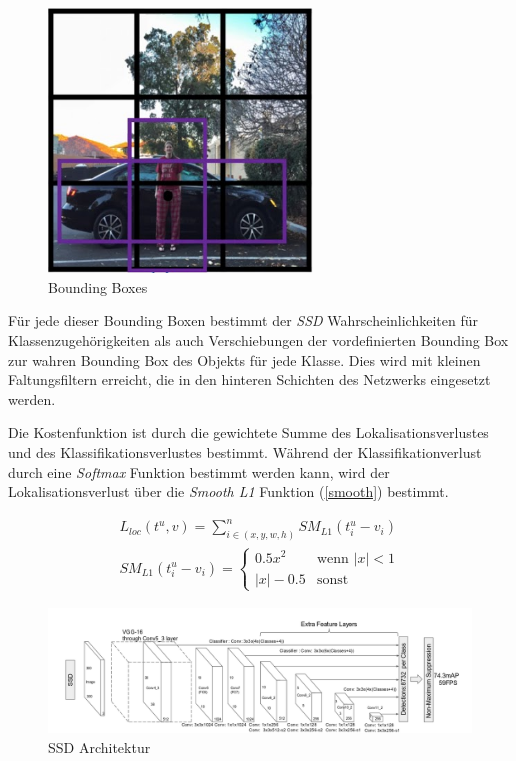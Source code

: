 \begin{figure}[ht]
	\begin{center}
		\includegraphics[width=7cm]{Bilder/bounding_boxes.png} 
		\caption[Bounding Boxes]{Bounding Boxes \cite{AndrewNg.2019}}
		\label{boundingboxes}
	\end{center}
\end{figure}

Für jede dieser Bounding Boxen bestimmt der \textit{SSD} Wahrscheinlichkeiten für Klassenzugehörigkeiten als auch Verschiebungen der vordefinierten Bounding Box zur wahren Bounding Box des Objekts für jede Klasse. Dies wird mit kleinen Faltungsfiltern erreicht, die in den hinteren Schichten des Netzwerks eingesetzt werden. \cite{ssd.20161229}

Die Kostenfunktion ist durch die gewichtete Summe des Lokalisationsverlustes und des Klassifikationsverlustes bestimmt. Während der Klassifikationverlust durch eine \textit{Softmax} Funktion bestimmt werden kann, wird der Lokalisationsverlust über die \textit{Smooth L1} Funktion (\ref{smooth}) bestimmt. \cite{ssd.20161229}

\begin{equation}\label{smooth}
\begin{split}
L_{loc}(t^u,v) = \sum\limits_{i \in (x,y,w,h)}^{n} SM_{L1}(t^u_i - v_i) \\
SM_{L1}(t^u_i - v_i) = \begin{cases}
							0.5x^2      & \text{wenn } |x| < 1\\
							|x| - 0.5   & \text{sonst}
						   \end{cases}
\end{split}
\end{equation}

\begin{figure}[ht]
	\begin{center}
		\includegraphics[width=15cm]{Bilder/ssd_architecture.png} 
		\caption[SSD Architektur]{SSD Architektur \cite{ssd.20161229}}
		\label{architecture}
	\end{center}
\end{figure}

